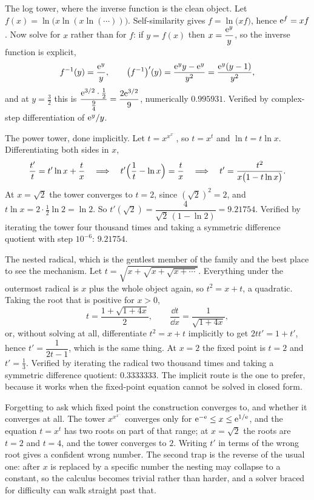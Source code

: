 \begin{worked}
The log tower, where the inverse function is the clean object. Let $f(x)=\ln\bigl(x\ln(x\ln(\cdots))\bigr)$. Self-similarity gives $f=\ln\bigl(xf\bigr)$, hence $\mathrm{e}^{f}=xf$. Now solve for $x$ rather than for $f$: if $y=f(x)$ then $x=\dfrac{\mathrm{e}^{y}}{y}$, so the inverse function is explicit,
\[
f^{-1}(y)=\frac{\mathrm{e}^{y}}{y},\qquad \bigl(f^{-1}\bigr)'(y)=\frac{\mathrm{e}^{y}y-\mathrm{e}^{y}}{y^{2}}=\frac{\mathrm{e}^{y}(y-1)}{y^{2}},
\]
and at $y=\tfrac32$ this is $\dfrac{\mathrm{e}^{3/2}\cdot\tfrac12}{\tfrac94}=\dfrac{2\mathrm{e}^{3/2}}{9}$, numerically $0.995931$. Verified by complex-step differentiation of $\mathrm{e}^{y}/y$.

The power tower, done implicitly. Let $t=x^{x^{x^{\cdots}}}$, so $t=x^{t}$ and $\ln t=t\ln x$. Differentiating both sides in $x$,
\[
\frac{t'}{t}=t'\ln x+\frac{t}{x}\quad\Longrightarrow\quad t'\Bigl(\frac1t-\ln x\Bigr)=\frac tx\quad\Longrightarrow\quad t'=\frac{t^{2}}{x\bigl(1-t\ln x\bigr)} .
\]
At $x=\sqrt2$ the tower converges to $t=2$, since $(\sqrt2)^{2}=2$, and $t\ln x=2\cdot\tfrac12\ln2=\ln 2$. So $t'(\sqrt2)=\dfrac{4}{\sqrt2\,(1-\ln2)}=9.21754$. Verified by iterating the tower four thousand times and taking a symmetric difference quotient with step $10^{-6}$: $9.21754$.


The nested radical, which is the gentlest member of the family and the best place to see the mechanism. Let $t=\sqrt{x+\sqrt{x+\sqrt{x+\cdots}}}$. Everything under the outermost radical is $x$ plus the whole object again, so $t^{2}=x+t$, a quadratic. Taking the root that is positive for $x>0$,
\[
t=\frac{1+\sqrt{1+4x}}{2},\qquad \frac{\dd t}{\dd x}=\frac{1}{\sqrt{1+4x}} ,
\]
or, without solving at all, differentiate $t^{2}=x+t$ implicitly to get $2tt'=1+t'$, hence $t'=\dfrac{1}{2t-1}$, which is the same thing. At $x=2$ the fixed point is $t=2$ and $t'=\tfrac13$. Verified by iterating the radical two thousand times and taking a symmetric difference quotient: $0.3333333$. The implicit route is the one to prefer, because it works when the fixed-point equation cannot be solved in closed form.
\end{worked}

\begin{trap}
Forgetting to ask which fixed point the construction converges to, and whether it converges at all. The tower $x^{x^{x^{\cdots}}}$ converges only for $\mathrm{e}^{-\mathrm{e}}\leq x\leq \mathrm{e}^{1/\mathrm{e}}$, and the equation $t=x^{t}$ has two roots on part of that range; at $x=\sqrt2$ the roots are $t=2$ and $t=4$, and the tower converges to $2$. Writing $t'$ in terms of the wrong root gives a confident wrong number. The second trap is the reverse of the usual one: after $x$ is replaced by a specific number the nesting may collapse to a constant, so the calculus becomes trivial rather than harder, and a solver braced for difficulty can walk straight past that.
\end{trap}

